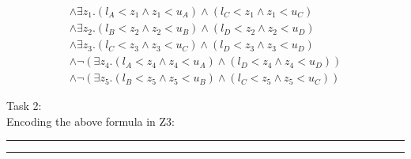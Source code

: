 \documentclass[12pt,letterpaper, onecolumn]{exam}
\begin{document}
\begin{questions}
\begin{align*}
		\land \exists z_1. (l_{A} < z_1 \land z_1 < u_{A}) \land (l_{C} < z_1 \land z_1 < u_{C}) \\
		\land \exists z_2. (l_{B} < z_2 \land z_2 < u_{B}) \land (l_{D} < z_2 \land z_2 < u_{D}) \\
		\land \exists z_3. (l_{C} < z_3 \land z_3 < u_{C}) \land (l_{D} < z_3 \land z_3 < u_{D}) \\
		\land \neg (\exists z_4. (l_{A} < z_4 \land z_4 < u_{A}) \land (l_{D} < z_4 \land z_4 < u_{D})) \\
		\land \neg (\exists z_5. (l_{B} < z_5 \land z_5 < u_{B}) \land (l_{C} < z_5 \land z_5 < u_{C}))
	\end{align*}
	
	Task 2: \\
	Encoding the above formula in Z3:
	
    {\rule{17cm}{0.4pt}}
	\question[]
	\solutiontitle


    {\rule{17cm}{0.4pt}}

\end{questions}
\end{document}
